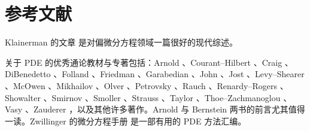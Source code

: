 \documentclass[../../main.tex]{subfiles}
\begin{document}
\section{参考文献}\label{section:ch01-references}

Klainerman 的文章 \cite{Kl} 是对偏微分方程领域一篇很好的现代综述。

关于 PDE 的优秀通论教材与专著包括：Arnold \cite{Ar2}、Courant--Hilbert \cite{C-H}、Craig \cite{Cr}、DiBenedetto \cite{DB1}、Folland \cite{F1}、Friedman \cite{Fr2}、Garabedian \cite{G}、John \cite{J2}、Jost \cite{Jo}、Levy--Shearer \cite{L-S}、McOwen \cite{MO}、Mikhailov \cite{M}、Olver \cite{O2}、Petrovsky \cite{Py}、Rauch \cite{R1}、Renardy--Rogers \cite{R-R}、Showalter \cite{Sh}、Smirnov \cite{Sm}、Smoller \cite{S}、Strauss \cite{St2}、Taylor \cite{Ta}、Thoe--Zachmanoglou \cite{T-Z}、Vasy \cite{Vy}、Zauderer \cite{Za}，以及其他许多著作。Arnold \cite{Ar2} 与 Bernstein \cite{Bt} 两书的前言尤其值得一读。Zwillinger 的微分方程手册 \cite{Zw} 是一部有用的 PDE 方法汇编。
\end{document}
